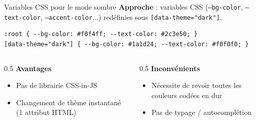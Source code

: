 \documentclass[aspectratio=169]{beamer}
\begin{document}
\begin{frame}[fragile]{Variables CSS pour le mode sombre}
  \textbf{Approche} : variables CSS (\texttt{--bg-color}, \texttt{--text-color}, \texttt{--accent-color}...) redéfinies sous \texttt{[data-theme="dark"]}.

  \begin{lstlisting}
:root { --bg-color: #f0f4ff; --text-color: #2c3e50; }
[data-theme="dark"] { --bg-color: #1a1d24; --text-color: #f0f0f0; }
  \end{lstlisting}

  \vspace{0.3cm}
  \begin{columns}
    \begin{column}{0.5\textwidth}
      \textbf{Avantages}
      \begin{itemize}
        \item Pas de librairie CSS-in-JS
        \item Changement de thème instantané (1 attribut HTML)
      \end{itemize}
    \end{column}
    \begin{column}{0.5\textwidth}
      \textbf{Inconvénients}
      \begin{itemize}
        \item Nécessite de revoir toutes les couleurs codées en dur
        \item Pas de typage / autocomplétion
      \end{itemize}
    \end{column}
  \end{columns}
\end{frame}
\end{document}
